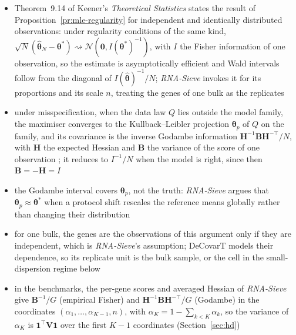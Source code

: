 \begin{remark}
  \label{rem:keener-godambe}
  \begin{itemize}
    \item Theorem~9.14 of Keener's \emph{Theoretical Statistics} \cite{keenerEstimatingEquationsMaximum2010} states the result of
          Proposition~\ref{pr:mle-regularity} for independent and identically distributed observations: under regularity
          conditions of the same kind, \(\sqrt{N}(\hat{\boldsymbol{\theta}}_{N}-\boldsymbol{\theta}^{\ast})\rightsquigarrow\mathcal{N}(\boldsymbol{0},I(\boldsymbol{\theta}^{\ast})^{-1})\),
          with \(I\) the Fisher information of one observation, so the estimate is asymptotically efficient and Wald intervals
          follow from the diagonal of \(I(\hat{\boldsymbol{\theta}})^{-1}/N\); \emph{RNA-Sieve} invokes it for its proportions and its
          scale \(n\), treating the genes of one bulk as the replicates
          \cite{erdmann-phamLikelihoodbasedDeconvolutionBulk2021}
    \item under misspecification, when the data law \(Q\) lies outside the model family, the maximiser converges to the
          Kullback--Leibler projection \(\boldsymbol{\theta}_{p}\) of \(Q\) on the family, and its covariance is the inverse Godambe
          information \(\boldsymbol{H}^{-1}\boldsymbol{B}\boldsymbol{H}^{-\top}/N\), with \(\boldsymbol{H}\) the expected Hessian and \(\boldsymbol{B}\) the variance of the
          score of one observation \cite{godambeOptimumPropertyRegular1960}; it reduces to \(I^{-1}/N\) when the model is right, since then \(\boldsymbol{B}=-\boldsymbol{H}=I\)
    \item the Godambe interval covers \(\boldsymbol{\theta}_{p}\), not the truth: \emph{RNA-Sieve} argues that \(\boldsymbol{\theta}_{p}\approx\boldsymbol{\theta}^{\ast}\)
          when a protocol shift rescales the reference means globally rather than changing their distribution
    \item for one bulk, the genes are the observations of this argument only if they are independent, which is
          \emph{RNA-Sieve}'s assumption; DeCovarT models their dependence, so its replicate unit is the bulk sample, or the
          cell in the small-dispersion regime below
    \item in the benchmarks, the per-gene scores and averaged Hessian of \emph{RNA-Sieve} give
          \(\boldsymbol{B}^{-1}/G\) (empirical Fisher) and \(\boldsymbol{H}^{-1}\boldsymbol{B}\boldsymbol{H}^{-\top}/G\) (Godambe) in the coordinates
          \((\alpha_{1},\ldots,\alpha_{K-1},n)\), with \(\alpha_{K}=1-\sum_{k<K}\alpha_{k}\), so the variance of \(\alpha_{K}\) is
          \(\mathbf{1}^{\top}\boldsymbol{V}\mathbf{1}\) over the first \(K-1\) coordinates (Section~\ref{sec:hd})
  \end{itemize}
\end{remark}

